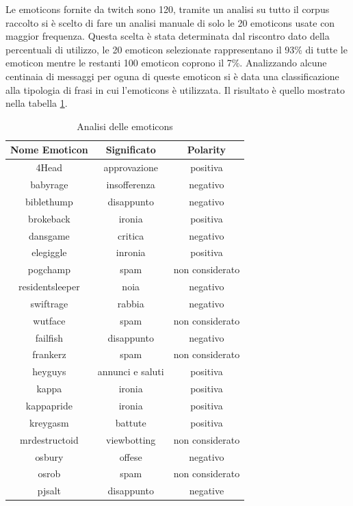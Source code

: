 \documentclass[a4paper,12pt,openright,twoside]{report}
\theoremstyle{definition}
\begin{document}
Le emoticons fornite da twitch sono 120, tramite un analisi su tutto il corpus raccolto si è scelto di fare un analisi
manuale di solo le 20 emoticons usate con maggior frequenza. Questa scelta è stata determinata 
dal riscontro dato della percentuali di utilizzo, le 20 emoticon selezionate rappresentano 
il 93\% di tutte le emoticon mentre le restanti 100 emoticon coprono il 7\%. 
Analizzando alcune centinaia di messaggi 
per oguna di queste emoticon
si è data una classificazione alla tipologia di frasi in cui l'emoticons è utilizzata. Il risultato è
quello mostrato nella tabella \ref{tab:emoticons1}.

\begin{table}[H]
\begin{center}
\begin{tabular}{|c|c|c|}
\hline
Nome Emoticon & Significato & Polarity \\
\hline
\hline
4Head & approvazione & positiva \\
\hline
babyrage & insofferenza & negativo \\
\hline
biblethump & disappunto & negativo \\
\hline
brokeback & ironia & positiva \\
\hline
dansgame & critica & negativo \\
\hline
elegiggle & inronia & positiva \\
\hline
pogchamp & spam & non considerato \\
\hline
residentsleeper & noia & negativo \\
\hline
swiftrage & rabbia & negativo \\
\hline
wutface & spam & non considerato \\
\hline
failfish & disappunto & negativo \\
\hline
frankerz & spam & non considerato \\
\hline
heyguys & annunci e saluti & positiva \\
\hline
kappa & ironia & positiva \\
\hline
kappapride & ironia & positiva \\
\hline
kreygasm & battute & positiva \\
\hline
mrdestructoid & viewbotting & non considerato \\
\hline
osbury & offese & negativo \\
\hline
osrob & spam & non considerato \\
\hline
pjsalt & disappunto & negative \\
\hline
\end{tabular}
\end{center}
\caption{Analisi delle emoticons}
\label{tab:emoticons1}
\end{table}
\end{document}

